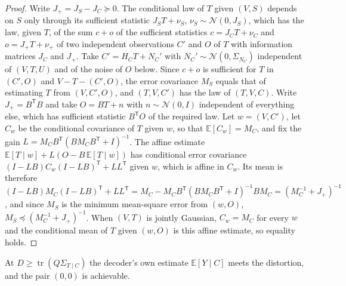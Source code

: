 \documentclass[11pt,onecolumn]{IEEEtran}
\newcommand{\E}{\mathbb{E}}
\newcommand{\tr}{\operatorname{tr}}
\begin{document}
\begin{proof}
Write $J_+=J_S-J_C\succeq0$. The conditional law of $T$ given $(V,S)$
depends on $S$ only through its sufficient statistic $J_ST+\nu_S$,
$\nu_S\sim\mathcal N(0,J_S)$, which has the law, given $T$, of the sum
$c+o$ of the sufficient statistics $c=J_CT+\nu_C$ and $o=J_+T+\nu_+$ of two
independent observations $C'$ and $O$ of $T$ with information matrices
$J_C$ and $J_+$. Take $C'=H_CT+N_C'$ with $N_C'\sim\mathcal N(0,\Sigma_{N_C})$
independent of $(V,T,U)$ and of the noise of $O$ below. Since $c+o$ is sufficient for $T$ in $(C',O)$ and
$V-T-(C',O)$, the error covariance $M_S$ equals that of estimating $T$
from $(V,C',O)$, and $(T,V,C')$ has the law of $(T,V,C)$. Write
$J_+=B^{\mathsf T}B$ and take $O=BT+n$ with $n\sim\mathcal N(0,I)$
independent of everything else, which has sufficient statistic
$B^{\mathsf T}O$ of the required law. Let $w=(V,C')$, let $C_w$ be the
conditional covariance of $T$ given $w$, so that $\E[C_w]=M_C$, and fix
the gain $L=M_CB^{\mathsf T}(BM_CB^{\mathsf T}+I)^{-1}$. The affine estimate
$\E[T\mid w]+L(O-B\,\E[T\mid w])$ has conditional error covariance
$(I-LB)C_w(I-LB)^{\mathsf T}+LL^{\mathsf T}$ given $w$, which is affine in
$C_w$. Its mean is therefore
$(I-LB)M_C(I-LB)^{\mathsf T}+LL^{\mathsf T}
=M_C-M_CB^{\mathsf T}(BM_CB^{\mathsf T}+I)^{-1}BM_C=(M_C^{-1}+J_+)^{-1}$,
and since $M_S$ is the minimum mean-square error from $(w,O)$,
$M_S\preceq(M_C^{-1}+J_+)^{-1}$. When $(V,T)$ is jointly Gaussian, $C_w=M_C$
for every $w$ and the conditional mean of $T$ given $(w,O)$ is this affine
estimate, so equality holds.
\end{proof}

At $D\ge\tr(Q\Sigma_{T\mid C})$ the decoder's own estimate
$\E[Y\mid C]$ meets the distortion, and the pair $(0,0)$ is achievable.
\end{document}
